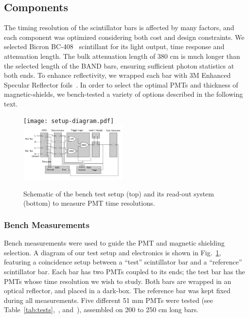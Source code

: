 \documentclass[3p,twocolumn]{elsarticle}
\begin{document}
\subsection{Components}
The timing resolution of the scintillator bars is affected by many
factors, and each component was optimized considering both cost and
 design constraints.
We selected Bicron BC-408~\cite{scint-mat-ref} scintillant for its
light output, time
response and attenuation length. The bulk attenuation length of 380
\si{\centi\meter} is much longer than the selected length of the BAND bars, ensuring sufficient
photon statistics at both ends. To enhance reflectivity, we wrapped
each bar with 3M Enhanced Specular Reflector foils~\cite{3MESR}. 
In order to select the optimal PMTs and thickness of magnetic-shields, we 
bench-tested a variety of options described in the following text.


\begin{figure}[tb]
	\centering
		\texttt{[image: setup-diagram.pdf]} \\
		\includegraphics[width=0.48\textwidth]{electr_setup.png}
	\caption{Schematic of the bench test setup (top) and its
          read-out system (bottom) to measure PMT time resolutions. }
	\label{fig:test_stand_setup}
\end{figure}

\subsubsection{Bench Measurements}

Bench measurements were used to guide the PMT and magnetic shielding
selection.  A diagram of our test setup and electronics is shown in
Fig.~\ref{fig:test_stand_setup}, featuring a coincidence setup between
a ``test'' scintillator bar and a ``reference'' scintillator bar.  Each
bar has two PMTs coupled to its ends; the test bar has the PMTs whose
time resolution we wish to study.  Both bars are wrapped in an optical
reflector, and placed in a dark-box.  The reference bar was kept fixed
during all measurements. Five different 51 \si{\milli\meter} PMTs were tested (see Table~\ref{tab:tests},~\cite{hamapmts}, and~\cite{pmt9214}), assembled on 200 to 250
\si{\centi\meter} long bars.
\end{document}
